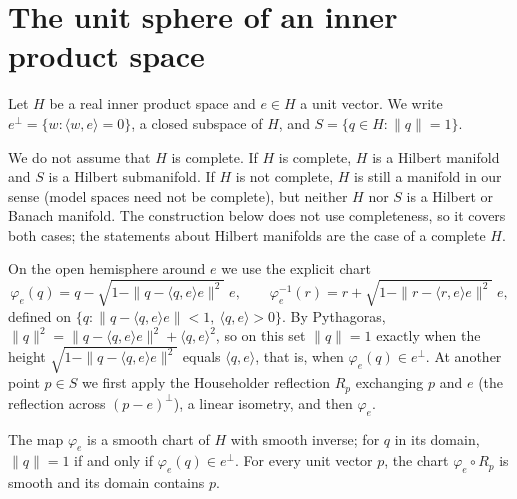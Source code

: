 \section{The unit sphere of an inner product space}

Let $H$ be a real inner product space and $e \in H$ a unit vector. We write
$e^\perp = \{w : \langle w, e\rangle = 0\}$, a closed subspace of $H$, and
$S = \{q \in H : \|q\| = 1\}$.

\begin{remark}[Completeness]
  We do not assume that $H$ is complete. If $H$ is complete, $H$ is a Hilbert manifold and $S$ is
  a Hilbert submanifold. If $H$ is not complete, $H$ is still a manifold in our sense (model
  spaces need not be complete), but neither $H$ nor $S$ is a Hilbert or Banach manifold. The
  construction below does not use completeness, so it covers both cases; the statements about
  Hilbert manifolds are the case of a complete $H$.
\end{remark}

On the open hemisphere around $e$ we use the explicit chart
\[
  \varphi_e(q) = q - \sqrt{1 - \|q - \langle q, e\rangle e\|^2}\; e, \qquad
  \varphi_e^{-1}(r) = r + \sqrt{1 - \|r - \langle r, e\rangle e\|^2}\; e,
\]
defined on $\{q : \|q - \langle q, e\rangle e\| < 1,\ \langle q, e\rangle > 0\}$. By Pythagoras,
$\|q\|^2 = \|q - \langle q, e\rangle e\|^2 + \langle q, e\rangle^2$, so on this set $\|q\| = 1$
exactly when the height $\sqrt{1 - \|q - \langle q,e\rangle e\|^2}$ equals $\langle q, e\rangle$,
that is, when $\varphi_e(q) \in e^\perp$. At another point $p \in S$ we first apply the
Householder reflection $R_p$ exchanging $p$ and $e$ (the reflection across
$(p - e)^\perp$), a linear isometry, and then $\varphi_e$.

\begin{lemma}
  \label{lem:ex-sphere-charts}
  \leanok
  The map $\varphi_e$ is a smooth chart of $H$ with smooth inverse; for $q$ in its domain,
  $\|q\| = 1$ if and only if $\varphi_e(q) \in e^\perp$. For every unit vector $p$, the chart
  $\varphi_e \circ R_p$ is smooth and its domain contains $p$.
\end{lemma}

